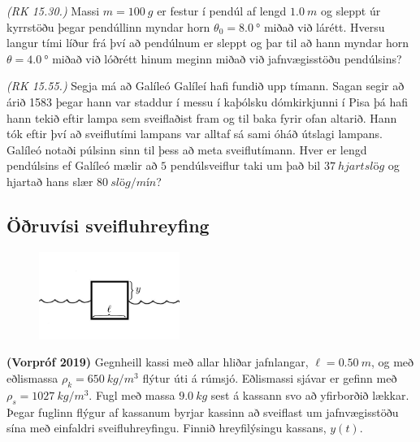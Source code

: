 \begin{enumerate}[label = \textbf{Dæmi \thechapter.\arabic*.}]
\item \textit{(RK 15.30.)} Massi $m = \SI{100}{g}$ er festur í pendúl af lengd $\SI{1.0}{m}$ og sleppt úr kyrrstöðu þegar pendúllinn myndar horn $\theta_0 = \SI{8.0}{\degree}$ miðað við lárétt. Hversu langur tími líður frá því að pendúlnum er sleppt og þar til að hann myndar horn $\theta = \SI{4.0}{\degree}$ miðað við lóðrétt hinum meginn miðað við jafnvægisstöðu pendúlsins?

\item \textit{(RK 15.55.)} Segja má að Galíleó Galíleí hafi fundið upp tímann. Sagan segir að árið 1583 þegar hann var staddur í messu í kaþólsku dómkirkjunni í Pisa þá hafi hann tekið eftir lampa sem sveiflaðist fram og til baka fyrir ofan altarið. Hann tók eftir því að sveiflutími lampans var alltaf sá sami óháð útslagi lampans. Galíleó notaði púlsinn sinn til þess að meta sveiflutímann. Hver er lengd pendúlsins ef Galíleó mælir að $5$ pendúlsveiflur taki um það bil $\SI{37}{hjartslög}$ og hjartað hans slær $\SI{80}{slög/mín}$?



\subsection*{Öðruvísi sveifluhreyfing}

\begin{minipage}{\linewidth}

\begin{figure}
\vspace{-1cm}
\includegraphics[width=1.8in]{images/kubbursjor.png}
\end{figure}
\item \textbf{(Vorpróf 2019)} Gegnheill kassi með allar hliðar jafnlangar, $\ell = \SI{0.50}{m}$, og með eðlismassa $\rho_k = \SI{650}{kg/m^3}$ flýtur úti á rúmsjó. Eðlismassi sjávar er gefinn með $\rho_s = \SI{1027}{kg/m^3}$. Fugl með massa $\SI{9.0}{kg}$ sest á kassann svo að yfirborðið lækkar. Þegar fuglinn flýgur af kassanum byrjar kassinn að sveiflast um jafnvægisstöðu sína með einfaldri sveifluhreyfingu. Finnið hreyfilýsingu kassans, $y(t)$.
\end{minipage}


\end{enumerate}
